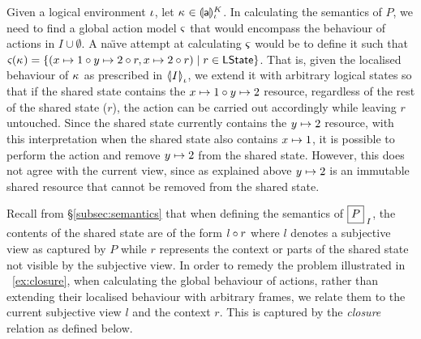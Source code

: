 \begin{example}[]
Given a logical environment $\lenv$, let $\ca{} \in \semK[\lenv]{\token{a}}$. In calculating the semantics of $P$, we need to find a global action model $\amod{}$ that would encompass the behaviour of actions in $I \cup \emptyset$. A na\"\i ve attempt at calculating $\amod{}$ would be to define it such that $\amod{}(\ca{}) = \left\{(\cell{x}{1} \composeL \cell{y}{2} \composeL r, \cell{x}{2} \composeL r ) \mid r \in \LStates \right\}$. That is, given the localised behaviour of $\ca{}$ as prescribed in $\semI[\lenv]{I}$, we extend it with arbitrary logical states so that if the shared state contains the $\cell{x}{1} \composeL \cell{y}{2}$ resource, regardless of the rest of the shared state ($r$), the action can be carried out accordingly while leaving $r$ untouched. Since the shared state currently contains the $\cell{y}{2}$ resource, with this interpretation when the shared state also contains $\cell{x}{1}$, it is possible to perform the action  and remove $\cell{y}{2}$ from the shared state. However, this does not agree with the current view, since as explained above $\cell{y}{2}$ is an immutable shared resource that cannot be removed from the shared state. 
\end{example}
Recall from \S\ref{subsec:semantics} that when defining the semantics of $\shared{P}{I}$, the contents of the shared state are of the form $l \composeL r$ where $l$ denotes a subjective view as captured by $P$ while $r$ represents the context or parts of the shared state not visible by the subjective view. In order to remedy the problem illustrated in \ex~\ref{ex:closure}, when calculating the global behaviour of actions, rather than extending their localised behaviour with arbitrary frames, we relate them to the current subjective view $l$ and the context $r$. This is captured by the \emph{closure} relation as defined below.
